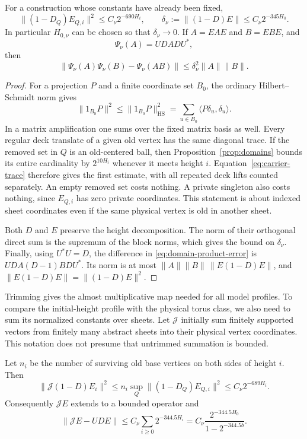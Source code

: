 \begin{lemma}\label{lem:assembly-trimming}
For a construction whose constants have already been fixed,
\[
 \|(1-D_Q)E_{Q,i}\|^2\le C_\nu2^{-690H_i},
 \qquad
 \delta_\nu:=\|(1-D)E\|\le C_\nu2^{-345H_0}.
\]
In particular $H_{0,\nu}$ can be chosen so that $\delta_\nu\to0$.
If $A=EAE$ and $B=EBE$, and
\[
 \Psi_\nu(A)=UDADU^*,
\]
then
\begin{equation}\label{eq:domain-product-error}
 \|\Psi_\nu(A)\Psi_\nu(B)-\Psi_\nu(AB)\|
       \le\delta_\nu^2\|A\|\|B\|.
\end{equation}
\end{lemma}

\begin{proof}
For a projection $P$ and a finite coordinate set $B_0$, the ordinary
Hilbert--Schmidt norm gives
\[
 \|1_{B_0}P\|^2\le\|1_{B_0}P\|_{\mathrm{HS}}^2
       =\sum_{u\in B_0}\langle P\delta_u,\delta_u\rangle.
\]
In a matrix amplification one sums over the fixed matrix basis as well.
Every regular deck translate of a given old vertex has the same diagonal
trace.  If the removed set in $Q$ is an old-centered ball, then
Proposition~\ref{prop:domains} bounds its entire cardinality by $2^{10H_i}$
whenever it meets height $i$.  Equation~\eqref{eq:carrier-trace} therefore
gives the first estimate, with all repeated deck lifts counted separately.
An empty removed set costs nothing.  A private singleton also costs nothing,
since $E_{Q,i}$ has zero private coordinates.  This statement is about indexed
sheet coordinates even if the same physical vertex is old in another sheet.

Both $D$ and $E$ preserve the height decomposition.  The norm of their
orthogonal direct sum is the supremum of the block norms, which gives the
bound on $\delta_\nu$.  Finally, using $U^*U=D$, the difference in
\eqref{eq:domain-product-error} is $UD A(D-1)B D U^*$.  Its norm is at most
$\|A\|\|B\|\,\|E(1-D)E\|$, and
$\|E(1-D)E\|=\|(1-D)E\|^2$.
\end{proof}

Trimming gives the almost multiplicative map needed for all model
profiles.  To compare the initial-height profile with the physical torus
class, we also need to sum its normalized constants over sheets.  Let
$\mathcal J$ initially sum finitely supported vectors from finitely many
abstract sheets into their physical vertex coordinates.  This notation does
not presume that untrimmed summation is bounded.

\begin{lemma}\label{lem:assembly-synthesis}
Let $n_i$ be the number of surviving old base vertices on both sides of height
$i$.  Then
\begin{equation}\label{eq:raw-synthesis-level}
 \|\mathcal J(1-D)E_i\|^2
 \le n_i\sup_Q\|(1-D_Q)E_{Q,i}\|^2
 \le C_\nu2^{-689H_i}.
\end{equation}
Consequently $\mathcal J E$ extends to a bounded operator and
\begin{equation}\label{eq:raw-synthesis-sum}
 \|\mathcal J E-UDE\|
 \le C_\nu\sum_{i\ge0}2^{-344.5H_i}
 =C_\nu\frac{2^{-344.5H_0}}{1-2^{-344.5b}}.
\end{equation}
\end{lemma}


